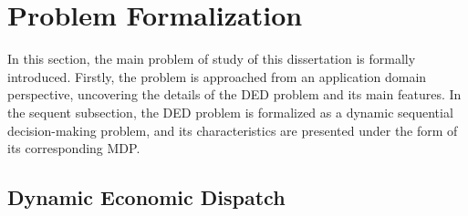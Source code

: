 \section{Problem Formalization}

In this section, the main problem of study of this dissertation is formally introduced. Firstly, the problem is approached from an application domain perspective, uncovering the details of the \ac{DED} problem and its main features. In the sequent subsection, the \ac{DED} problem is formalized as a dynamic sequential decision-making problem, and its characteristics are presented under the form of its corresponding \ac{MDP}.

\subsection{Dynamic Economic Dispatch}

